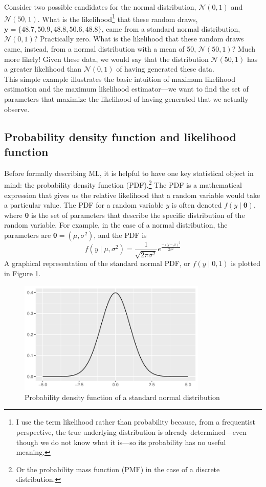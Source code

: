\documentclass[11pt,letterpaper]{article}
\begin{document}
\noindent Consider two possible candidates for the normal distribution, $\mathcal{N}(0, 1)$ and $\mathcal{N}(50, 1)$. What is the likelihood\footnote{I use the term likelihood rather than probability because, from a frequentist perspective, the true underlying distribution is already determined---even though we do not know what it is---so its probability has no useful meaning.} that these random draws, $\bm{y} = \{48.7, 50.9, 48.8, 50.6, 48.8\}$, came from a standard normal distribution, $\mathcal{N}(0, 1)$? Practically zero. What is the likelihood that these random draws came, instead, from a normal distribution with a mean of 50, $\mathcal{N}(50, 1)$? Much more likely! Given these data, we would say that the distribution $\mathcal{N}(50, 1)$ has a greater likelihood than $\mathcal{N}(0, 1)$ of having generated these data. \\ 

\noindent This simple example illustrates the basic intuition of maximum likelihood estimation and the maximum likelihood estimator---we want to find the set of parameters that maximize the likelihood of having generated that we actually observe.

\subsection{Probability density function and likelihood function}

Before formally describing ML, it is helpful to have one key statistical object in mind: the probability density function (PDF).\footnote{Or the probability mass function (PMF) in the case of a discrete distribution.} The PDF is a mathematical expression that gives us the relative likelihood that a random variable would take a particular value. The PDF for a random variable $y$ is often denoted $f(y \mid \bm{\theta})$, where $\bm{\theta}$ is the set of parameters that describe the specific distribution of the random variable. For example, in the case of a normal distribution, the parameters are $\bm{\theta} = \left( \mu, \sigma^2 \right)$, and the PDF is
$$f(y \mid \mu, \sigma^2) = \frac{1}{\sqrt{2 \pi \sigma^2}} e^{\frac{-(y - \mu)^2}{2 \sigma^2}}$$
A graphical representation of the standard normal PDF, or $f(y \mid 0, 1)$ is plotted in Figure \ref{fig:norm_pdf}.

\begin{figure}[htbp]
  \caption{Probability density function of a standard normal distribution}
  \label{fig:norm_pdf}
  \centering
  \includegraphics[width=0.8\textwidth]{norm_pdf.pdf}
\end{figure}
\end{document}
